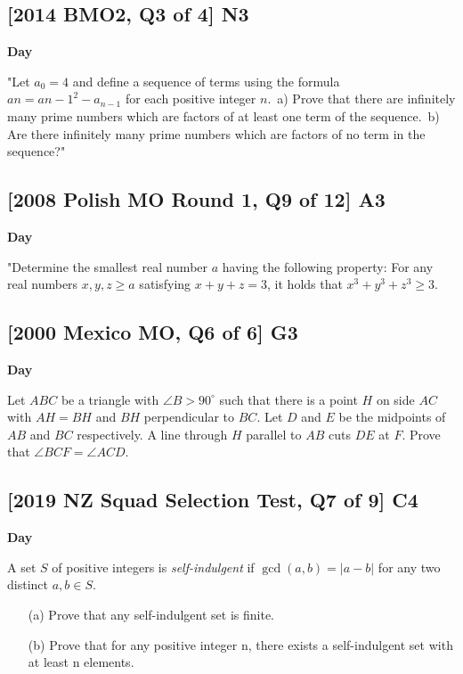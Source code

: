 \documentclass[10pt]{article}
\newcommand{\themonth}{March}
\newcommand{\theyear}{2019}
\newcounter{day}
\newcounter{solution}
\newcounter{datenumber}
\newcommand{\problem}[4][0]{
	\newpage
	\subsection{[#3] \space #2} \hfill 
	{\large\textbf{Day \arabic{day}}} %
	\begin{flushleft} #4 \end{flushleft}
	\vspace{1em}
	\addtocounter{day}{1}
	\addtocounter{datenumber}{1}
	\setcounter{solution}{1}
}
\begin{document}
\problem[50]{N3}{2014 BMO2, Q3 of 4}{"Let $a_0 = 4$ and define a sequence of terms using the formula $an = a{n-1}^2 - a_{n-1}$ for each positive integer $n$.\
	a) Prove that there are infinitely many prime numbers which are factors of at least one term of the sequence.\
	b) Are there infinitely many prime numbers which are factors of no term in the sequence?"}

\problem[51]{A3}{2008 Polish MO Round 1, Q9 of 12}{"Determine the smallest real number $a$ having the following property: For any real numbers $x,y,z \geq a$ satisfying $x+y+z = 3$, it holds that $x^3 + y^3 + z^3 \geq 3$.}

\problem[52]{G3}{2000 Mexico MO, Q6 of 6}{Let $ABC$ be a triangle with $\angle B > 90^{\circ}$ such that there is a point $H$ on side $AC$ with $AH = BH$ and $BH$ perpendicular to $BC$. Let $D$ and $E$ be the midpoints of $AB$ and $BC$ respectively. A line through $H$ parallel to $AB$ cuts $DE$ at $F$. Prove that $\angle BCF = \angle ACD$.}

\problem[53]{C4}{2019 NZ Squad Selection Test, Q7 of 9}{A set $S$ of positive integers is \textit{self-indulgent} if $\gcd (a, b) = \vert a - b \vert$ for any two distinct $a, b \in S$. \begin{itemize} \item[(a)] Prove that any self-indulgent set is finite. \item[(b)] Prove that for any positive integer n, there exists a self-indulgent set with at least n elements. \end{itemize}}
\end{document}

